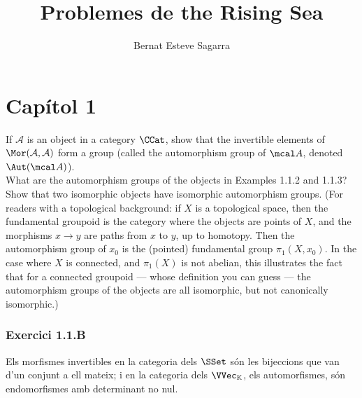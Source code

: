 \documentclass[11pt, a4paper]{article}
\title{Problemes de the Rising Sea}
\author{Bernat Esteve Sagarra}
\begin{document}
\pagestyle{fancy}
% 
\section*{Capítol 1}
\begin{tcolorbox}[title=\subsection{Exercici 1.1.B}]
    
    If $\mathcal{A}$ is an object in a category $\CCat$, show that the invertible elements of $\Mor(\mathcal A, \mathcal A)$ form a group (called the automorphism group of $\mcal A$, denoted $\Aut(\mcal A)$).\\
    What are the automorphism groups of the objects in Examples 1.1.2 and 1.1.3? Show that two isomorphic objects have isomorphic automorphism groups. (For readers with a topological background: if $X$ is a topological space, then the fundamental groupoid is the category where the objects are points of $X$, and the morphisms $x \to y$ are paths from $x$ to $y$, up to homotopy. Then the automorphism group of $x_0$ is the (pointed) fundamental group $\pi_1(X, x_0)$. In the case where $X$ is connected, and $\pi_1(X)$ is not abelian, this illustrates the fact that for a connected groupoid — whose definition you can guess — the automorphism groups of the objects are all isomorphic, but not canonically isomorphic.)
\end{tcolorbox}
\subsubsection{Exercici 1.1.B}
Els morfismes invertibles en la categoria dels $\SSet$ són les bijeccions que 
van d'un conjunt a ell mateix; i en la categoria dels $\VVec_\KK$, els automorfismes, són endomorfismes amb determinant no nul.
\end{document}
